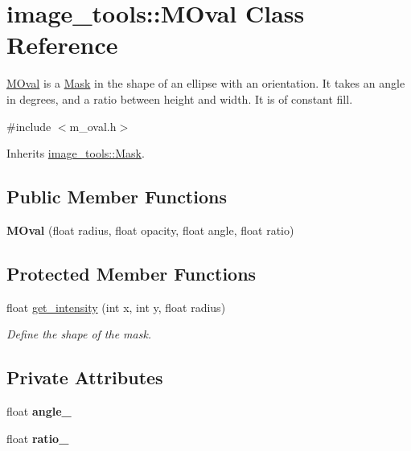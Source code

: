 \hypertarget{classimage__tools_1_1MOval}{}\section{image\+\_\+tools\+:\+:M\+Oval Class Reference}
\label{classimage__tools_1_1MOval}


\hyperlink{classimage__tools_1_1MOval}{M\+Oval} is a \hyperlink{classimage__tools_1_1Mask}{Mask} in the shape of an ellipse with an orientation. It takes an angle in degrees, and a ratio between height and width. It is of constant fill.  




{\ttfamily \#include $<$m\+\_\+oval.\+h$>$}



Inherits \hyperlink{classimage__tools_1_1Mask}{image\+\_\+tools\+::\+Mask}.

\subsection*{Public Member Functions}
\begin{DoxyCompactItemize}
\item 
{\bfseries M\+Oval} (float radius, float opacity, float angle, float ratio)\hypertarget{classimage__tools_1_1MOval_a07eb3a42c66b79837d5969310b7873ff}{}\label{classimage__tools_1_1MOval_a07eb3a42c66b79837d5969310b7873ff}

\end{DoxyCompactItemize}
\subsection*{Protected Member Functions}
\begin{DoxyCompactItemize}
\item 
float \hyperlink{classimage__tools_1_1MOval_ae7767ec154487373d5944f2a02a834f0}{get\+\_\+intensity} (int x, int y, float radius)
\begin{DoxyCompactList}\small\item\em Define the shape of the mask. \end{DoxyCompactList}\end{DoxyCompactItemize}
\subsection*{Private Attributes}
\begin{DoxyCompactItemize}
\item 
float {\bfseries angle\+\_\+}\hypertarget{classimage__tools_1_1MOval_aae754123d96fdc1a7a037020d4b16903}{}\label{classimage__tools_1_1MOval_aae754123d96fdc1a7a037020d4b16903}

\item 
float {\bfseries ratio\+\_\+}\hypertarget{classimage__tools_1_1MOval_a377bf4e7e6abace99f663163a18fc1be}{}\label{classimage__tools_1_1MOval_a377bf4e7e6abace99f663163a18fc1be}

\end{DoxyCompactItemize}


